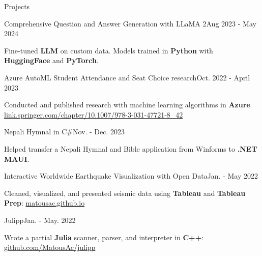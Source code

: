 \begin{rSection}{Projects}
  \begin{project}{Comprehensive Question and Answer Generation with LLaMA 2}{Aug 2023 - May 2024}
    \item Fine-tuned {\bf LLM} on custom data. Models trained in {\bf Python} with {\bf HuggingFace} and {\bf PyTorch}.
  \end{project}
  \begin{project}{Azure AutoML Student Attendance and Seat Choice research}{Oct. 2022 - April 2023}
    \item Conducted and published research with machine learning algorithms in {\bf Azure}\\
    \href{https://link.springer.com/chapter/10.1007/978-3-031-47721-8_42}{link.springer.com/chapter/10.1007/978-3-031-47721-8\_42}
  \end{project}
  \begin{project}{Nepali Hymnal in C\#}{Nov. - Dec. 2023}
    \item Helped transfer a Nepali Hymnal and Bible application from Winforms to {\bf .NET} {\bf MAUI}.
  \end{project}
  \begin{project}{Interactive Worldwide Earthquake Visualization with Open Data}{Jan. - May 2022}
    \item Cleaned, visualized, and presented seismic data using {\bf Tableau} and {\bf Tableau Prep}: \href{https://matousac.github.io/}{matousac.github.io}
  \end{project}
  \begin{project}{Julipp}{Jan. - May. 2022}
    \item Wrote a partial {\bf Julia} scanner, parser, and interpreter in {\bf C++}: \href{https://github.com/MatousAc/julipp}{github.com/MatousAc/julipp}
  \end{project}
\end{rSection}